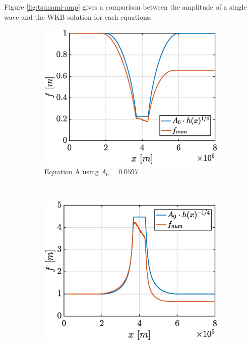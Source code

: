 \documentclass[a4paper,12pt,twoside]{article}
\begin{document}
      Figure \ref{fig:tsunami-amp} gives a comparison between the amplitude of a single wave and the WKB solution for each equations.

      \begin{figure}[h]
        \centering
        \begin{subfigure}{0.45\textwidth}
          \centering
          \includegraphics[width=\textwidth]{graphs/tsunami_amp_A.eps}
          \caption{Equation A using $A_0 = \num{0.0597}$}
          \label{fig:tsunami-amp-A}
        \end{subfigure}
        ~
        \begin{subfigure}{0.45\textwidth}
          \centering
          \includegraphics[width=\textwidth]{graphs/tsunami_amp_B.eps}

\end{subfigure}
\end{figure}
\end{document}
